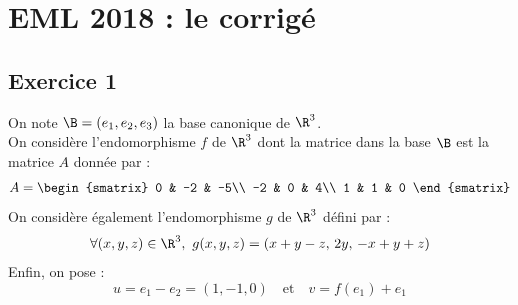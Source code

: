 \chapter*{EML 2018 : le corrigé}
  
%

\section*{Exercice 1}

\noindent
On note $\B=(e_1,e_2,e_3)$ la base canonique de $\R^3$.\\
On considère l'endomorphisme $f$ de $\R^3$ dont la matrice dans la base 
$\B$ est la matrice $A$ donnée par :
\[
  A =
  \begin{smatrix}
    0 & -2 & -5\\
    -2 & 0 & 4\\
    1 & 1 & 0
  \end{smatrix}
\]
On considère également l'endomorphisme $g$ de $\R^3$ défini par :
\[
  \forall (x,y,z) \in \R^3, \ g(x,y,z) = (x+y-z, \, 2y, \, -x+y+z)
\]
Enfin, on pose : 
\[
  u=e_1-e_2=(1,-1,0) \quad \text{et} \quad v=f(e_1)+e_1
\]

